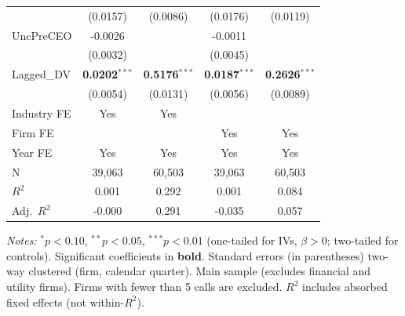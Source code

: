 \begin{landscape}
\begin{table}[H]
\begin{tabular}{lcccc}
 & (0.0157) & (0.0086) & (0.0176) & (0.0119) \\
UncPreCEO & -0.0026 &  & -0.0011 &  \\
 & (0.0032) &  & (0.0045) &  \\
Lagged\_DV & \textbf{0.0202}$^{***}$ & \textbf{0.5176}$^{***}$ & \textbf{0.0187}$^{***}$ & \textbf{0.2626}$^{***}$ \\
 & (0.0054) & (0.0131) & (0.0056) & (0.0089) \\
\midrule
Industry FE & Yes & Yes &  &  \\
Firm FE &  &  & Yes & Yes \\
Year FE & Yes & Yes & Yes & Yes \\
\midrule
N & 39,063 & 60,503 & 39,063 & 60,503 \\
$R^2$ & 0.001 & 0.292 & 0.001 & 0.084 \\
Adj.~$R^2$ & -0.000 & 0.291 & -0.035 & 0.057 \\
\bottomrule
\end{tabular}
\begin{minipage}{\linewidth}
\vspace{2pt}\scriptsize
\textit{Notes:} $^{*}p<0.10$, $^{**}p<0.05$, $^{***}p<0.01$ (one-tailed for IVs, $\beta > 0$; two-tailed for controls).
 Significant coefficients in \textbf{bold}.
 Standard errors (in parentheses) two-way clustered (firm, calendar quarter).
 Main sample (excludes financial and utility firms). Firms with fewer than 5 calls are excluded.
 $R^2$ includes absorbed fixed effects (not within-$R^2$).
\end{minipage}
\end{table}
\end{landscape}